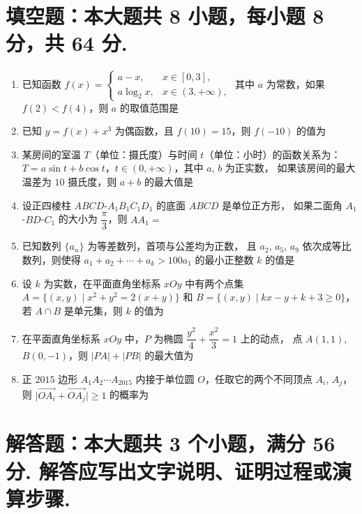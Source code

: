 \documentclass{chsmc}
\begin{document}
\section{填空题：本大题共 8 小题，每小题 8 分，共 64 分.}

\begin{enumerate}
	\item 已知函数
		$f(x)=\begin{cases}
			a-x, & x \in [0,3], \\
			a\log_2 x, & x \in (3,+\infty),
		\end{cases}$
		其中 $a$ 为常数，如果 $f(2) < f(4)$，则 $a$ 的取值范围是 \blankline
	\item 已知 $y = f(x) + x^3$ 为偶函数，且 $f(10) = 15$，则 $f(-10)$ 的值为 \blankline
	\item 某房间的室温 $T$（单位：摄氏度）与时间 $t$（单位：小时）的函数关系为：
		$T = a\sin t + b\cos t$，$t \in (0,+\infty)$，其中 $a$, $b$ 为正实数，
		如果该房间的最大温差为 $10$ 摄氏度，则 $a+b$ 的最大值是 \blankline
	\item 设正四棱柱 $ABCD$-$A_1B_1C_1D_1$ 的底面 $ABCD$ 是单位正方形，
		如果二面角 $A_1$-$BD$-$C_1$ 的大小为 $\dfrac{\pi}{3}$，则 $AA_1 =$ \blankline
	\item 已知数列 $\{a_n\}$ 为等差数列，首项与公差均为正数，
		且 $a_2$, $a_5$, $a_9$ 依次成等比数列，则使得
		$a_1+a_2+\cdots+a_k > 100a_1$ 的最小正整数 $k$ 的值是 \blankline
	\item 设 $k$ 为实数，在平面直角坐标系 $xOy$ 中有两个点集
		$A = \{(x,y)\mid x^2+y^2 = 2(x+y)\}$ 和
		$B = \{(x,y)\mid kx-y+k+3 \geqslant 0\}$，
		若 $A \cap B$ 是单元集，则 $k$ 的值为 \blankline
	\item 在平面直角坐标系 $xOy$ 中，$P$ 为椭圆 $\dfrac{y^2}{4} + \dfrac{x^2}{3} = 1$ 上的动点，
		点 $A(1,1)$, $B(0,-1)$，则 $|PA|+|PB|$ 的最大值为 \blankline
	\item 正 $2015$ 边形 $A_1A_2\cdots A_{2015}$ 内接于单位圆 $O$，任取它的两个不同顶点
		$A_i$, $A_j$，则 $\bigl|\overrightarrow{OA_i} + \overrightarrow{OA_j}\bigr| \geqslant 1$
		的概率为 \blankline
\end{enumerate}

\section{解答题：本大题共 3 个小题，满分 56 分. 解答应写出文字说明、证明过程或演算步骤.}
\end{document}

